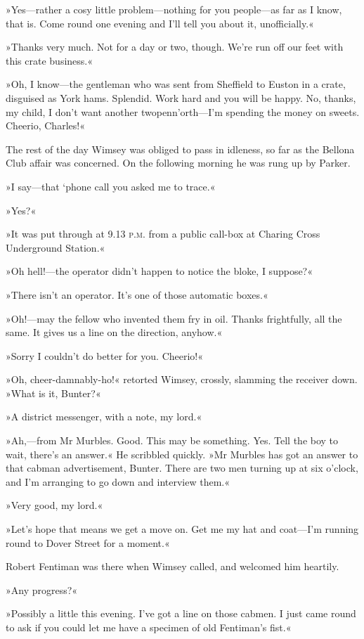 »Yes—rather a cosy little problem—nothing for you people—as far as I know, that is. Come round one evening and I'll tell you about it, unofficially.«

»Thanks very much. Not for a day or two, though. We're run off our feet with this crate business.«

»Oh, I know—the gentleman who was sent from Sheffield to Euston in a crate, disguised as York hams. Splendid. Work hard and you will be happy. No, thanks, my child, I don't want another twopenn'orth—I'm spending the money on sweets. Cheerio, Charles!«

The rest of the day Wimsey was obliged to pass in idleness, so far as the Bellona Club affair was concerned. On the following morning he was rung up by Parker.

»I say—that `phone call you asked me to trace.«

»Yes?«

»It was put through at 9.13 \textsc{p.m.} from a public call-box at Charing Cross Underground Station.«

»Oh hell!—the operator didn't happen to notice the bloke, I suppose?«

»There isn't an operator. It's one of those automatic boxes.«

»Oh!—may the fellow who invented them fry in oil. Thanks frightfully, all the same. It gives us a line on the direction, anyhow.«

»Sorry I couldn't do better for you. Cheerio!«

»Oh, cheer-damnably-ho!« retorted Wimsey, crossly, slamming the receiver down. »What is it, Bunter?«

»A district messenger, with a note, my lord.«

»Ah,—from Mr Murbles. Good. This may be something. Yes. Tell the boy to wait, there's an answer.« He scribbled quickly. »Mr Murbles has got an answer to that cabman advertisement, Bunter. There are two men turning up at six o'clock, and I'm arranging to go down and interview them.«

»Very good, my lord.«

»Let's hope that means we get a move on. Get me my hat and coat—I'm running round to Dover Street for a moment.«

Robert Fentiman was there when Wimsey called, and welcomed him heartily.

»Any progress?«

»Possibly a little this evening. I've got a line on those cabmen. I just came round to ask if you could let me have a specimen of old Fentiman's fist.«

